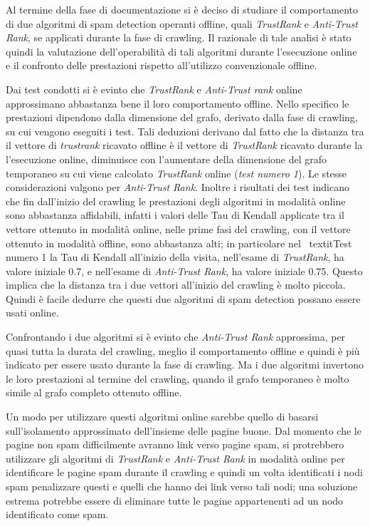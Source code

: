 Al termine della fase di documentazione si è deciso di studiare il comportamento di due algoritmi di spam detection operanti offline, quali \textit{TrustRank} e \textit{Anti-Trust Rank}, se applicati durante la fase di crawling. Il razionale di tale analisi è stato quindi la valutazione dell'operabilità di tali algoritmi durante l'esecuzione online e il confronto delle prestazioni rispetto all'utilizzo convenzionale offline.

Dai test condotti si è evinto che \textit{TrustRank} e \textit{Anti-Trust rank} online approssimano abbastanza bene il loro comportamento offline. Nello specifico le prestazioni dipendono dalla dimensione del grafo, derivato dalla fase di crawling, su cui vengono eseguiti i test. Tali deduzioni derivano dal fatto che la distanza tra il vettore di \textit{trustrank} ricavato offline è il vettore di \textit{TrustRank} ricavato durante la l'esecuzione online, diminuisce con l'aumentare della dimensione del grafo temporaneo su cui viene calcolato \textit{TrustRank} online (\textit{test numero 1}). Le stesse considerazioni valgono per \textit{Anti-Trust Rank}. Inoltre i risultati dei test  indicano che fin dall'inizio del crawling le prestazioni degli algoritmi in modalità online sono abbastanza affidabili, infatti i valori delle Tau di Kendall applicate tra il vettore ottenuto in modalità online, nelle prime fasi del crawling, con il vettore ottenuto in modalità offline, sono abbastanza alti; in particolare nel \
textit{Test numero 1} la Tau di Kendall all'inizio della visita,  nell'esame di \textit{TrustRank}, ha valore iniziale 0.7, e nell'esame di \textit{Anti-Trust Rank}, ha  valore iniziale 0.75. Questo implica che la distanza tra i due vettori all'inizio del crawling è molto piccola. Quindi è facile dedurre che questi due algoritmi di spam detection possano essere usati online.

Confrontando i due algoritmi si è evinto che \textit{Anti-Trust Rank} approssima, per quasi tutta la durata del crawling, meglio il comportamento offline e quindi è più indicato per essere usato durante la fase di crawling. Ma i due algoritmi invertono le loro prestazioni al termine del crawling, quando il grafo temporaneo è molto simile al grafo completo ottenuto offline.

Un modo per utilizzare questi algoritmi online sarebbe quello di basarsi sull'isolamento approssimato dell'insieme delle pagine buone. Dal momento che le pagine non spam difficilmente avranno link verso pagine spam, si protrebbero utilizzare gli algoritmi di \textit{TrustRank} e \textit{Anti-Trust Rank} in modalità online per identificare le pagine spam durante il crawling e quindi un volta identificati i nodi spam penalizzare questi e quelli che hanno dei link verso tali nodi; una soluzione estrema potrebbe essere di eliminare tutte le pagine appartenenti ad un nodo identificato come spam.

